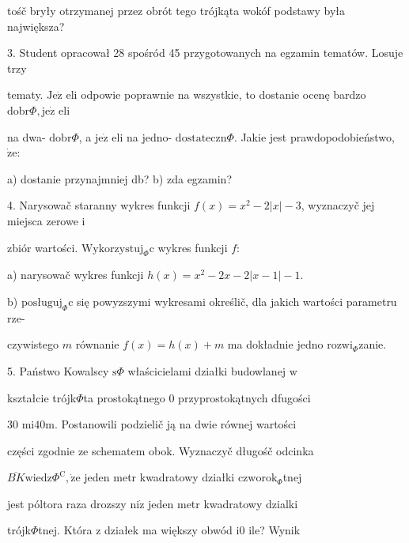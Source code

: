\documentclass[a4paper,12pt]{article}
\begin{document}
tośč bryły otrzymanej przez obrót tego trójkąta wokóf podstawy była największa?

3. Student opracował 28 spośród 45 przygotowanych na egzamin tematów. Losuje trzy

tematy. $\mathrm{J}\mathrm{e}\dot{\mathrm{z}}$ eli odpowie poprawnie na wszystkie, to dostanie ocenę bardzo $\mathrm{d}\mathrm{o}\mathrm{b}\mathrm{r}\Phi, \mathrm{j}\mathrm{e}\dot{\mathrm{z}}$ eli

na dwa- $\mathrm{d}\mathrm{o}\mathrm{b}\mathrm{r}\Phi$, a $\mathrm{j}\mathrm{e}\dot{\mathrm{z}}$ eli na jedno- $\mathrm{d}\mathrm{o}\mathrm{s}\mathrm{t}\mathrm{a}\mathrm{t}\mathrm{e}\mathrm{c}\mathrm{z}\mathrm{n}\Phi$. Jakie jest prawdopodobieństwo, $\dot{\mathrm{z}}\mathrm{e}$:

a) dostanie przynajmniej db? b) zda egzamin?

4. Narysowač staranny wykres funkcji $f(x)=x^{2}-2|x|-3$, wyznaczyč jej miejsca zerowe $\mathrm{i}$

zbiór wartości. $\mathrm{W}\mathrm{y}\mathrm{k}\mathrm{o}\mathrm{r}\mathrm{z}\mathrm{y}\mathrm{s}\mathrm{t}\mathrm{u}\mathrm{j}_{\Phi}\mathrm{c}$ wykres funkcji $f$:

a) narysowač wykres funkcji $h(x)=x^{2}-2x-2|x-1|-1.$

b) $\mathrm{p}\mathrm{o}\mathrm{s}\text{ł} \mathrm{u}\mathrm{g}\mathrm{u}\mathrm{j}_{\Phi}\mathrm{c}$ się powyzszymi wykresami określič, dla jakich wartości parametru rze-

czywistego $m$ równanie $f(x)=h(x)+m$ ma dokładnie jedno $\mathrm{r}\mathrm{o}\mathrm{z}\mathrm{w}\mathrm{i}_{\Phi}$zanie.

5. Państwo Kowalscy $\mathrm{s}\Phi$ właścicielami działki budowlanej $\mathrm{w}$

kształcie trójk$\Phi$ta prostokątnego $0$ przyprostokątnych dfugości

30 $\mathrm{m}\mathrm{i}40\mathrm{m}$. Postanowili podzielič ją na dwie równej wartości

części zgodnie ze schematem obok. Wyznaczyč długośč odcinka

$\overline{BK}\mathrm{w}\mathrm{i}\mathrm{e}\mathrm{d}\mathrm{z}\Phi^{\mathrm{C}}, \dot{\mathrm{z}}\mathrm{e}$ jeden metr kwadratowy działki $\mathrm{c}\mathrm{z}\mathrm{w}\mathrm{o}\mathrm{r}\mathrm{o}\mathrm{k}_{\Phi}$tnej

jest póltora raza drozszy $\mathrm{n}\mathrm{i}\dot{\mathrm{z}}$ jeden metr kwadratowy dzialki

trójk$\Phi$tnej. Która $\mathrm{z}$ działek ma większy obwód $\mathrm{i}0$ ile? Wynik
\end{document}
